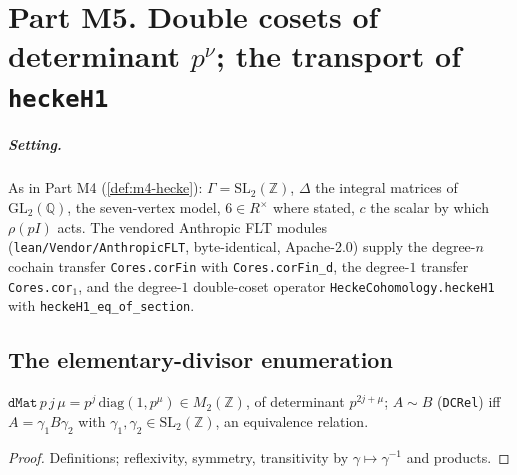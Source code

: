 
\chapter{Part M5. Double cosets of determinant \texorpdfstring{$p^\nu$}{p\textasciicircum nu}; the transport of \texttt{heckeH1}}\label{ch:m5}

\paragraph{Setting.} As in Part M4 (\ref{def:m4-hecke}): $\Gamma=\mathrm{SL}_2(\mathbb Z)$, $\Delta$ the integral matrices of
$\mathrm{GL}_2(\mathbb Q)$, the seven-vertex model, $6\in R^\times$ where stated, $c$ the scalar by which $\rho(pI)$ acts. The
vendored Anthropic FLT modules (\texttt{lean/Vendor/AnthropicFLT}, byte-identical, Apache-2.0) supply the degree-$n$ cochain
transfer \texttt{Cores.corFin} with \texttt{Cores.corFin\_d}, the degree-$1$ transfer \texttt{Cores.cor}$_1$, and the degree-$1$ double-coset
operator \texttt{HeckeCohomology.heckeH1} with \texttt{heckeH1\_eq\_of\_section}.

\section{The elementary-divisor enumeration}

\begin{definition}\label{def:m5-dmat}
  \leanok
  $\texttt{dMat}\,p\,j\,\mu=p^j\,\mathrm{diag}(1,p^\mu)\in M_2(\mathbb Z)$, of determinant $p^{2j+\mu}$; $A\sim B$
  (\texttt{DCRel}) iff $A=\gamma_1B\gamma_2$ with $\gamma_1,\gamma_2\in\mathrm{SL}_2(\mathbb Z)$, an equivalence relation.
\end{definition}
\begin{proof}
  \leanok
  Definitions; reflexivity, symmetry, transitivity by $\gamma\mapsto\gamma^{-1}$ and products.
\end{proof}

